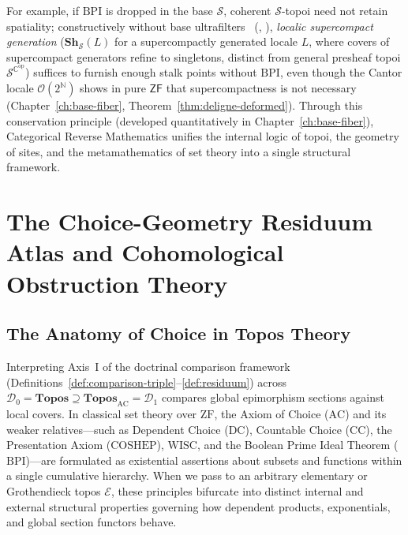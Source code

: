 For example, if $\mathrm{BPI}$ is dropped in the base $\mathcal{S}$, coherent $\mathcal{S}$-topoi need not retain spatiality; constructively without base ultrafilters~\cite{Deligne72} (\cite[Ch.~II, \S\S 2--4]{Johnstone82}, \cite[\S D3.3]{Johnstone02}), \emph{localic supercompact generation} ($\mathbf{Sh}_{\mathcal{S}}(L)$ for a supercompactly generated locale $L$, where covers of supercompact generators refine to singletons, distinct from general presheaf topoi $\mathcal{S}^{\mathbb{C}^{\mathrm{op}}}$) suffices to furnish enough stalk points without $\mathrm{BPI}$, even though the Cantor locale $\mathcal{O}(2^{\mathbb{N}})$ shows in pure $\mathsf{ZF}$ that supercompactness is not necessary (Chapter~\ref{ch:base-fiber}, Theorem~\ref{thm:deligne-deformed}). Through this conservation principle (developed quantitatively in Chapter~\ref{ch:base-fiber}), Categorical Reverse Mathematics unifies the internal logic of topoi, the geometry of sites, and the metamathematics of set theory into a single structural framework.

\chapter{The Choice-Geometry Residuum Atlas and Cohomological Obstruction Theory}

\label{ch:choice-atlas}

\section{The Anatomy of Choice in Topos Theory}

Interpreting Axis~I of the doctrinal comparison framework (Definitions~\ref{def:comparison-triple}--\ref{def:residuum}) across $\mathcal{D}_0 = \mathbf{Topos} \supseteq \mathbf{Topos}_{\mathrm{AC}} = \mathcal{D}_1$ compares global epimorphism sections against local covers. In classical set theory over $\mathrm{ZF}$, the Axiom of Choice ($\mathrm{AC}$) and its weaker relatives---such as Dependent Choice ($\mathrm{DC}$), Countable Choice ($\mathrm{CC}$), the Presentation Axiom ($\mathrm{COSHEP}$), $\mathrm{WISC}$, and the Boolean Prime Ideal Theorem ($\mathrm{BPI}$)---are formulated as existential assertions about subsets and functions within a single cumulative hierarchy. When we pass to an arbitrary elementary or Grothendieck topos $\mathcal{E}$, these principles bifurcate into distinct internal and external structural properties governing how dependent products, exponentials, and global section functors behave.

